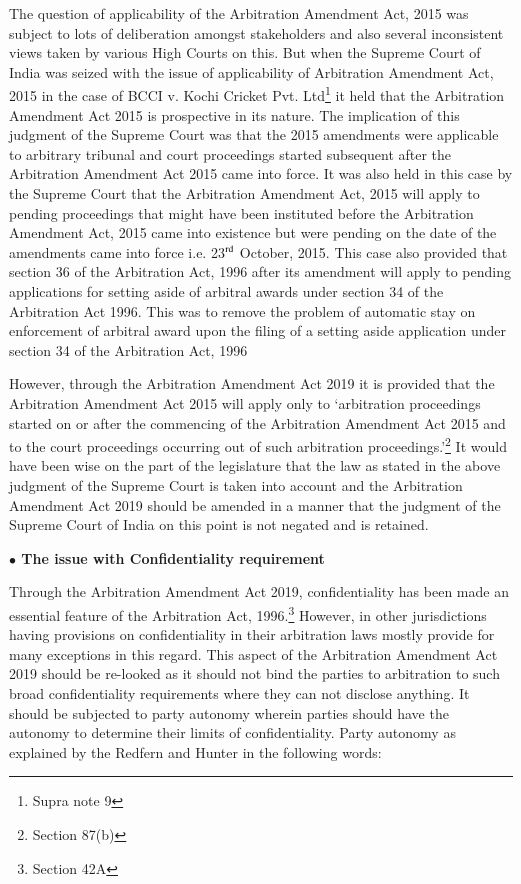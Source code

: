 \begin{multicols}{2}
\noi
The question of applicability of the Arbitration Amendment Act, 2015 was subject to lots of
deliberation amongst stakeholders and also several inconsistent views taken by various High
Courts on this. But when the Supreme Court of India was seized with the issue of
applicability of Arbitration Amendment Act, 2015 in the case of BCCI v. Kochi Cricket Pvt.
Ltd\footnote{Supra note 9} it held that the Arbitration Amendment Act 2015 is prospective in its nature. The
implication of this judgment of the Supreme Court was that the 2015 amendments were
applicable to arbitrary tribunal and court proceedings started subsequent after the Arbitration
Amendment Act 2015 came into force. It was also held in this case by the Supreme Court
that the Arbitration Amendment Act, 2015 will apply to pending proceedings that might have
been instituted before the Arbitration Amendment Act, 2015 came into existence but were
pending on the date of the amendments came into force i.e. 23$^{\rm rd}$ October, 2015. This case also
provided that section 36 of the Arbitration Act, 1996 after its amendment will apply to
pending applications for setting aside of arbitral awards under section 34 of the Arbitration
Act 1996. This was to remove the problem of automatic stay on enforcement of arbitral
award upon the filing of a setting aside application under section 34 of the Arbitration Act,
1996

\noi
However, through the Arbitration Amendment Act 2019 it is provided that the Arbitration
Amendment Act 2015 will apply only to ‘arbitration proceedings started on or after the
commencing of the Arbitration Amendment Act 2015 and to the court proceedings occurring
out of such arbitration proceedings.’\footnote{Section 87(b)} It would have been wise on the part of the legislature
that the law as stated in the above judgment of the Supreme Court is taken into account and
the Arbitration Amendment Act 2019 should be amended in a manner that the judgment of
the Supreme Court of India on this point is not negated and is retained.

\noi
{\large \bfseries $\bullet$ The issue with Confidentiality requirement}

\noi
Through the Arbitration Amendment Act 2019, confidentiality has been made an essential
feature of the Arbitration Act, 1996.\footnote{Section 42A} However, in other jurisdictions having provisions on
confidentiality in their arbitration laws mostly provide for many exceptions in this regard.
This aspect of the Arbitration Amendment Act 2019 should be re-looked as it should not bind 
the parties to arbitration to such broad confidentiality requirements where they can not
disclose anything. It should be subjected to party autonomy wherein parties should have the
autonomy to determine their limits of confidentiality. Party autonomy as explained by the
Redfern and Hunter in the following words:


\end{multicols}
